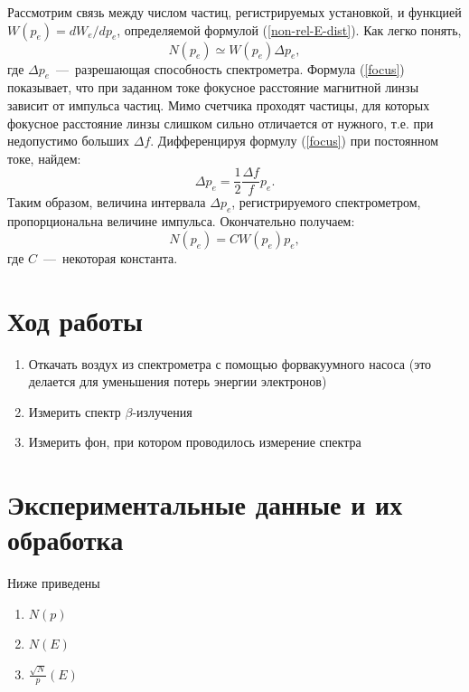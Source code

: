 \documentclass{physlab}
\begin{document}
Рассмотрим связь между числом частиц, регистрируемых установкой, и функцией $W(p_e) = dW_e/dp_e$, определяемой формулой (\ref{non-rel-E-dist}). Как легко понять, 
\begin{equation}
N(p_e) \simeq W(p_e) \Delta p_e,
\end{equation}
где $\Delta p_e$~---~разрешающая способность спектрометра. Формула (\ref{focus}) показывает, что при заданном токе фокусное расстояние магнитной линзы зависит от импульса частиц. Мимо счетчика проходят частицы, для которых фокусное расстояние линзы слишком сильно отличается от нужного, т.е. при недопустимо больших $\Delta f$. Дифференцируя формулу (\ref{focus}) при постоянном токе, найдем:
\begin{equation}
\Delta p_e = \frac{1}{2} \frac{\Delta f}{f} p_e.
\end{equation}
Таким образом, величина интервала $\Delta p_e$, регистрируемого спектрометром, пропорциональна величине импульса. Окончательно получаем:
\begin{equation}
N(p_e) = C W(p_e) p_e, 
\end{equation}
где $C$~---~некоторая константа.

\section{Ход работы}

\begin{enumerate}
\item Откачать воздух из спектрометра с помощью форвакуумного насоса (это делается для уменьшения потерь энергии электронов)

\item Измерить спектр $\beta$-излучения

\item Измерить фон, при котором проводилось измерение спектра

\end{enumerate}
\section{Экспериментальные данные и их обработка}

Ниже приведены
\begin{enumerate}
\item $N(p)$
\item $N(E)$
\item $\frac{\sqrt{N}}{p} (E)$
\end{enumerate}
\end{document}
